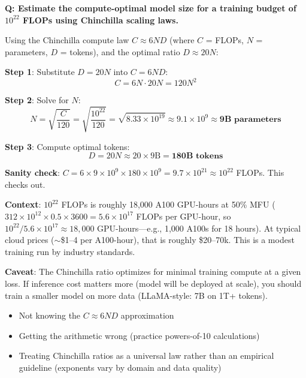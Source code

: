 \begin{interviewq}
\textbf{Q: Estimate the compute-optimal model size for a training budget of $10^{22}$ FLOPs using Chinchilla scaling laws.}

 \quad {} \quad \badgefreq{\freqhigh}

\stronganswer
Using the Chinchilla compute law $C \approx 6ND$ (where $C$ = FLOPs, $N$ = parameters, $D$ = tokens), and the optimal ratio $D \approx 20N$:

\textbf{Step 1}: Substitute $D = 20N$ into $C = 6ND$:
\[C = 6N \cdot 20N = 120N^2\]

\textbf{Step 2}: Solve for $N$:
\[N = \sqrt{\frac{C}{120}} = \sqrt{\frac{10^{22}}{120}} = \sqrt{8.33 \times 10^{19}} \approx 9.1 \times 10^9 \approx \textbf{9B parameters}\]

\textbf{Step 3}: Compute optimal tokens:
\[D = 20N \approx 20 \times 9\text{B} = \textbf{180B tokens}\]

\textbf{Sanity check}: $C = 6 \times 9 \times 10^9 \times 180 \times 10^9 = 9.7 \times 10^{21} \approx 10^{22}$ FLOPs. This checks out.

\textbf{Context}: $10^{22}$ FLOPs is roughly 18{,}000 A100 GPU-hours at 50\% MFU ($312 \times 10^{12} \times 0.5 \times 3600 = 5.6 \times 10^{17}$ FLOPs per GPU-hour, so $10^{22} / 5.6 \times 10^{17} \approx 18{,}000$ GPU-hours---e.g., 1,000 A100s for 18 hours). At typical cloud prices ($\sim$\$1--4 per A100-hour), that is roughly \$20--70k. This is a modest training run by industry standards.

\textbf{Caveat}: The Chinchilla ratio optimizes for minimal training compute at a given loss. If inference cost matters more (model will be deployed at scale), you should train a smaller model on more data (LLaMA-style: 7B on 1T+ tokens).

\redflags
\begin{itemize}
    \item Not knowing the $C \approx 6ND$ approximation
    \item Getting the arithmetic wrong (practice powers-of-10 calculations)
    \item Treating Chinchilla ratios as a universal law rather than an empirical guideline (exponents vary by domain and data quality)
\end{itemize}



\end{interviewq}
